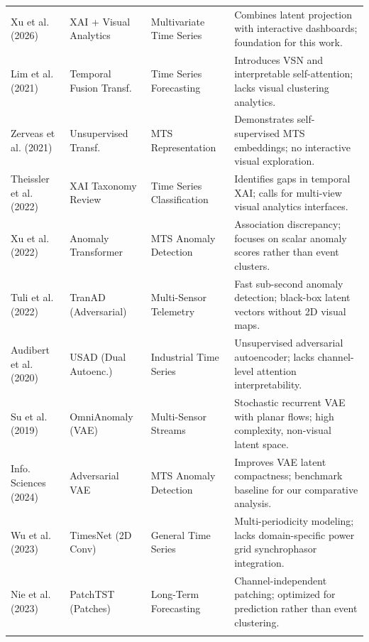 \documentclass[12pt,a4paper]{report}
\begin{document}
\begin{singlespace}
\begin{xltabular}{\textwidth}{>{\raggedright\arraybackslash}p{2.6cm} >{\raggedright\arraybackslash}p{2.6cm} >{\raggedright\arraybackslash}p{2.6cm} >{\raggedright\arraybackslash}X}
Xu et al. (2026) \cite{ref_xu2026_xai} & XAI + Visual Analytics & Multivariate Time Series & Combines latent projection with interactive dashboards; foundation for this work. \\ \addlinespace[3pt]
Lim et al. (2021) \cite{ref_lim2021_tft} & Temporal Fusion Transf. & Time Series Forecasting & Introduces VSN and interpretable self-attention; lacks visual clustering analytics. \\ \addlinespace[3pt]
Zerveas et al. (2021) \cite{ref_zerveas2021_transformer} & Unsupervised Transf. & MTS Representation & Demonstrates self-supervised MTS embeddings; no interactive visual exploration. \\ \addlinespace[3pt]
Theissler et al. (2022) \cite{ref_theissler2022_xai} & XAI Taxonomy Review & Time Series Classification & Identifies gaps in temporal XAI; calls for multi-view visual analytics interfaces. \\ \addlinespace[3pt]
Xu et al. (2022) \cite{ref_xu2022_anomaly} & Anomaly Transformer & MTS Anomaly Detection & Association discrepancy; focuses on scalar anomaly scores rather than event clusters. \\ \addlinespace[3pt]
Tuli et al. (2022) \cite{ref_tuli2022_tranad} & TranAD (Adversarial) & Multi-Sensor Telemetry & Fast sub-second anomaly detection; black-box latent vectors without 2D visual maps. \\ \addlinespace[3pt]
Audibert et al. (2020) \cite{ref_audibert2020_usad} & USAD (Dual Autoenc.) & Industrial Time Series & Unsupervised adversarial autoencoder; lacks channel-level attention interpretability. \\ \addlinespace[3pt]
Su et al. (2019) \cite{ref_su2019_omnianomaly} & OmniAnomaly (VAE) & Multi-Sensor Streams & Stochastic recurrent VAE with planar flows; high complexity, non-visual latent space. \\ \addlinespace[3pt]
Info. Sciences (2024) \cite{ref_adv_vae2024} & Adversarial VAE & MTS Anomaly Detection & Improves VAE latent compactness; benchmark baseline for our comparative analysis. \\ \addlinespace[3pt]
Wu et al. (2023) \cite{ref_wu2023_timesnet} & TimesNet (2D Conv) & General Time Series & Multi-periodicity modeling; lacks domain-specific power grid synchrophasor integration. \\ \addlinespace[3pt]
Nie et al. (2023) \cite{ref_nie2023_patchtst} & PatchTST (Patches) & Long-Term Forecasting & Channel-independent patching; optimized for prediction rather than event clustering. \\ \addlinespace[3pt]

\end{xltabular}
\end{singlespace}
\end{document}
